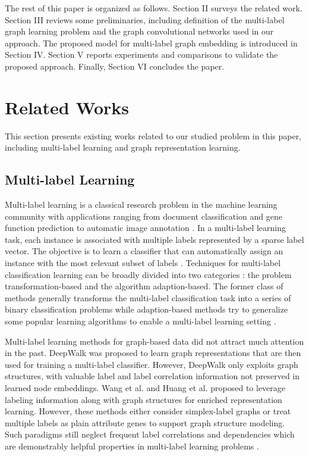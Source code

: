 \documentclass[conference]{IEEEtran}
\begin{document}
The rest of this paper is organized as follows. Section II surveys the related work. Section III reviews some preliminaries, including definition of the multi-label graph learning problem and the graph convolutional networks used in our approach. The proposed model for multi-label graph embedding is introduced in Section IV. Section V reports experiments and comparisons to validate the proposed approach. Finally, Section VI concludes the paper.

\section{Related Works}
This section presents existing works related to our studied problem in this paper, including multi-label learning and graph representation learning.

\subsection{Multi-label Learning}
Multi-label learning is a classical research problem in the machine learning community with applications ranging from document classification and gene function prediction to automatic image annotation \cite{15}. In a multi-label learning task, each instance is associated with multiple labels represented by a sparse label vector. The objective is to learn a classifier that can automatically assign an instance with the most relevant subset of labels \cite{8}. Techniques for multi-label classification learning can be broadly divided into two categories \cite{16}: the problem transformation-based and the algorithm adaption-based. The former class of methods generally transforms the multi-label classification task into a series of binary classification problems \cite{6,18} while adaption-based methods try to generalize some popular learning algorithms to enable a multi-label learning setting \cite{19,20}.

Multi-label learning methods for graph-based data did not attract much attention in the past. DeepWalk \cite{21} was proposed to learn graph representations that are then used for training a multi-label classifier. However, DeepWalk only exploits graph structures, with valuable label and label  correlation information not preserved in learned node embeddings. Wang et al. \cite{4} and Huang et al. \cite{13} proposed to leverage labeling information along with graph structures for enriched representation learning. However, these methods either consider simplex-label graphs or treat multiple labels as plain attribute genes to support graph structure modeling. Such paradigms still neglect frequent label correlations and dependencies which are demonstrably helpful properties in multi-label learning problems \cite{9,10}.
\end{document}

